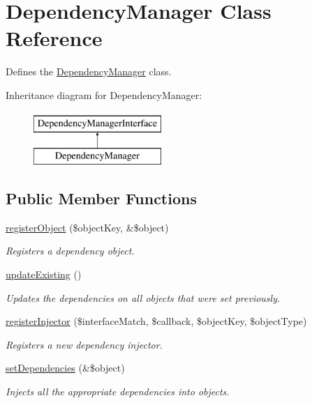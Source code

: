 \hypertarget{classDependencyManager}{\section{Dependency\-Manager Class Reference}
\label{classDependencyManager}
}


Defines the \hyperlink{classDependencyManager}{Dependency\-Manager} class.  


Inheritance diagram for Dependency\-Manager\-:\begin{figure}[H]
\begin{center}
\leavevmode
\includegraphics[height=2.000000cm]{classDependencyManager}
\end{center}
\end{figure}
\subsection*{Public Member Functions}
\begin{DoxyCompactItemize}
\item 
\hyperlink{classDependencyManager_a3640db4711fa27c693eea64b40aad06a}{register\-Object} (\$object\-Key, \&\$object)
\begin{DoxyCompactList}\small\item\em Registers a dependency object. \end{DoxyCompactList}\item 
\hyperlink{classDependencyManager_ae895b528a91fe1cc2de05bdc3f4b371a}{update\-Existing} ()
\begin{DoxyCompactList}\small\item\em Updates the dependencies on all objects that were set previously. \end{DoxyCompactList}\item 
\hyperlink{classDependencyManager_a5ea8c9e858247eda9408037cb9ae364c}{register\-Injector} (\$interface\-Match, \$callback, \$object\-Key, \$object\-Type)
\begin{DoxyCompactList}\small\item\em Registers a new dependency injector. \end{DoxyCompactList}\item 
\hyperlink{classDependencyManager_a069efa0cc8857115f1440df4a4768b90}{set\-Dependencies} (\&\$object)
\begin{DoxyCompactList}\small\item\em Injects all the appropriate dependencies into objects. \end{DoxyCompactList}\end{DoxyCompactItemize}
